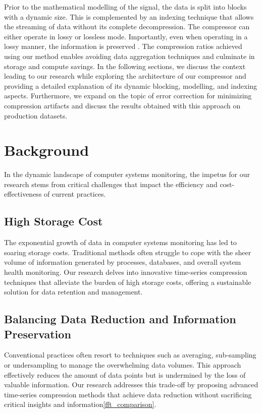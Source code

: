 \documentclass[conference]{IEEEtran}
\begin{document}
Prior to the mathematical modelling of the signal, the data is split into blocks with a dynamic size.
This is complemented by an indexing technique that allows the streaming of data without its complete decompression.
The compressor can either operate in lossy or lossless mode. Importantly, even when operating in a lossy manner, the information is preserved  .
The compression ratios achieved using our method enables avoiding data aggregation techniques and culminate in storage and compute savings.
In the following sections, we discuss the context leading to our research while exploring the architecture of our compressor and providing a detailed explanation of its dynamic blocking, modelling, and indexing aspects. Furthermore, we expand on the topic of error correction for minimizing compression artifacts and discuss the results obtained with this approach on production datasets.

\section{Background}

In the dynamic landscape of computer systems monitoring, the impetus for our research stems from critical challenges that impact the efficiency and cost-effectiveness of current practices. 

\subsection{High Storage Cost}

The exponential growth of data in computer systems monitoring has led to soaring storage costs. Traditional methods often struggle to cope with the sheer volume of information generated by processes, databases, and overall system health monitoring. Our research delves into innovative time-series compression techniques that alleviate the burden of high storage costs, offering a sustainable solution for data retention and management. 

\subsection{Balancing Data Reduction and Information Preservation}
Conventional practices often resort to techniques such as averaging, sub-sampling or undersampling to manage the overwhelming data volumes. This approach effectively reduces the amount of data points but is undermined by the loss of valuable information.
Our research addresses this trade-off by proposing advanced time-series compression methods that achieve data reduction without sacrificing critical insights and information\ref{fft_comparison}. 
\end{document}
